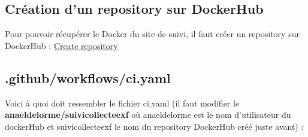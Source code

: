 \documentclass[
  letterpaper,
  DIV=11,
  numbers=noendperiod]{scrreprt}
\newenvironment{Shaded}{\begin{snugshade}}{\end{snugshade}}
\newcommand{\CommentTok}[1]{\textcolor[rgb]{0.37,0.37,0.37}{#1}}
\newcommand{\DecValTok}[1]{\textcolor[rgb]{0.68,0.00,0.00}{#1}}
\newcommand{\NormalTok}[1]{\textcolor[rgb]{0.00,0.23,0.31}{#1}}
\newcommand{\OperatorTok}[1]{\textcolor[rgb]{0.37,0.37,0.37}{#1}}
\newcommand{\SpecialCharTok}[1]{\textcolor[rgb]{0.37,0.37,0.37}{#1}}
\newcommand{\StringTok}[1]{\textcolor[rgb]{0.13,0.47,0.30}{#1}}
\begin{document}
\begin{Shaded}
\end{Shaded}

\hypertarget{cruxe9ation-dun-repository-sur-dockerhub}{%
\subsection{Création d'un repository sur
DockerHub}\label{cruxe9ation-dun-repository-sur-dockerhub}}

Pour pouvoir récupérer le Docker du site de suivi, il faut créer un
repository sur DockerHub :
\href{https://hub.docker.com/repository/create}{Create repository}

\hypertarget{githubworkflowsci.yaml}{%
\subsection{.github/workflows/ci.yaml}\label{githubworkflowsci.yaml}}

Voici à quoi doit ressembler le fichier ci.yaml (il faut modifier le
\textbf{anaeldelorme/suivicollecteexf} où anaeldelorme est le nom
d'utilisateur du dockerHub et suivicollecteexf le nom du repository
DockerHub créé juste avant) :
\end{document}
